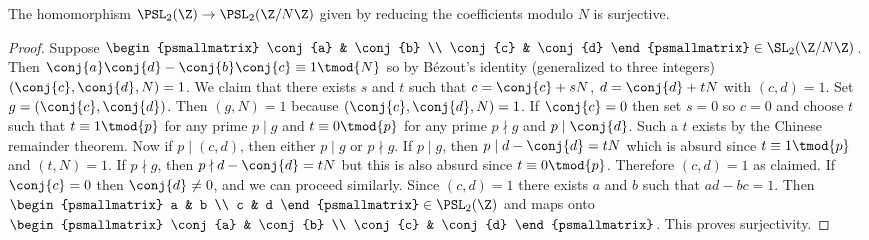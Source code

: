       \begin{proposition}\label{prop:surjective_modulo_N_for_modular_group}
        The homomorphism $\PSL_{2}(\Z) \to \PSL_{2}(\Z/N\Z)$ given by reducing the coefficients modulo $N$ is surjective.
      \end{proposition}
      \begin{proof}
        Suppose $\begin{psmallmatrix} \conj{a} & \conj{b} \\ \conj{c} & \conj{d} \end{psmallmatrix} \in \SL_{2}(\Z/N\Z)$. Then $\conj{a}\conj{d}-\conj{b}\conj{c} \equiv 1 \tmod{N}$ so by B\'ezout's identity (generalized to three integers) $(\conj{c},\conj{d},N) = 1$. We claim that there exists $s$ and $t$ such that $c = \conj{c}+sN$, $d = \conj{d}+tN$ with $(c,d) = 1$. Set $g = (\conj{c},\conj{d})$. Then $(g,N) = 1$ because $(\conj{c},\conj{d},N) = 1$. If $\conj{c} = 0$ then set $s = 0$ so $c = 0$ and choose $t$ such that $t \equiv 1 \tmod{p}$ for any prime $p \mid g$ and $t \equiv 0 \tmod{p}$ for any prime $p \nmid g$ and $p \mid \conj{d}$. Such a $t$ exists by the Chinese remainder theorem. Now if $p \mid (c,d)$, then either $p \mid g$ or $p \nmid g$. If $p \mid g$, then $p \mid d-\conj{d} = tN$ which is absurd since $t \equiv 1 \tmod{p}$ and $(t,N) = 1$. If $p \nmid g$, then $p \nmid d-\conj{d} = tN$ but this is also absurd since $t \equiv 0 \tmod{p}$. Therefore $(c,d) = 1$ as claimed. If $\conj{c} = 0$ then $\conj{d} \neq 0$, and we can proceed similarly. Since $(c,d) = 1$ there exists $a$ and $b$ such that $ad-bc = 1$. Then $\begin{psmallmatrix} a & b \\ c & d \end{psmallmatrix} \in \PSL_{2}(\Z)$ and maps onto $\begin{psmallmatrix} \conj{a} & \conj{b} \\ \conj{c} & \conj{d} \end{psmallmatrix}$. This proves surjectivity.
      \end{proof}
      
